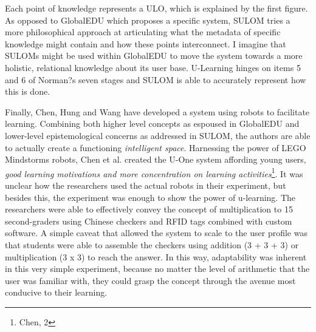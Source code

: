 \documentclass[twoside]{article}
\begin{document}
\begin{multicols}{2}
\begin{flushright}
\end{flushright}
Each point of knowledge represents a ULO, which is explained by the first figure. As opposed to GlobalEDU which proposes a specific system, SULOM tries a more philosophical approach at articulating what the metadata of specific knowledge might contain and how these points interconnect. I imagine that SULOMs might be used within GlobalEDU to move the system towards a more holistic, relational knowledge about its user base. U-Learning hinges on items 5 and 6 of Norman?s seven stages and SULOM is able to accurately represent how this is done.

\setlength\parindent{24pt}Finally, Chen, Hung and Wang have developed a system using robots to facilitate learning. Combining both higher level concepts as espoused in GlobalEDU and lower-level epistemological concerns as addressed in SULOM, the authors are able to actually create a functioning \emph{intelligent space}. Harnessing the power of LEGO Mindstorms robots, Chen et al. created the U-One system affording young users, \emph{good learning motivations and more concentration on learning activities}\footnote{Chen, 2}. It was unclear how the researchers used the actual robots in their experiment, but besides this, the experiment was enough to show the power of u-learning. The researchers were able to effectively convey the concept of multiplication to 15 second-graders using Chinese checkers and RFID tags combined with custom software. A simple caveat that allowed the system to scale to the user profile was that students were able to assemble the checkers using addition (3 + 3 + 3) or multiplication (3 x 3) to reach the answer. In this way, adaptability was inherent in this very simple experiment, because no matter the level of arithmetic that the user was familiar with, they could grasp the concept through the avenue most conducive to their learning. 



\end{multicols}
\end{document}
